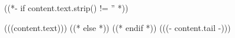 ((*- if content.text.strip() != '' *))
\par 
(((content.text)))
((* else *))
((* endif *))
 (((- content.tail -)))


